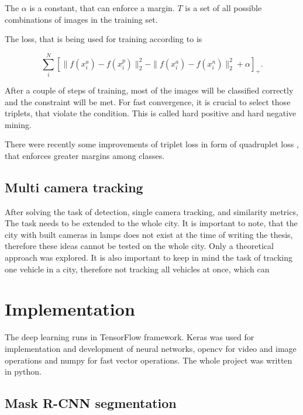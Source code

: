 \documentclass[a4paper,11pt,titlepage,twoside]{article}
\numberwithin{figure}{section}
\begin{document}
The $\alpha$ is a constant, that can enforce a margin. $T$ is a set of all possible combinations of images in the training set.

The loss, that is being used for training according to \cite{szegedy2015going} is 

\begin{equation}
\sum_i^N [\|f(x_i^a) - f(x_i^p)\|^2_2 - \|f(x_i^a) - f(x_i^n)\|^2_2 + \alpha]_+.
\end{equation}

After a couple of steps of training, most of the images will be classified correctly and the constraint will be met. For fast convergence, it is crucial to select those triplets, that violate the condition. This is called hard positive and hard negative mining.

There were recently some improvements of triplet loss in form of quadruplet loss \cite{chen2017beyond}, that enforces greater margins among classes.

\clearpage
\subsection{Multi camera tracking}
\label{sec:multi-camera-tracking}
After solving the task of detection, single camera tracking, and similarity metrics, The task needs to be extended to the whole city. It is important to note, that the city with built cameras in lamps does not exist at the time of writing the thesis, therefore these ideas cannot be tested on the whole city. Only a theoretical approach was explored. It is also important to keep in mind the task of tracking one vehicle in a city, therefore not tracking all vehicles at once, which can 


\clearpage
\section{Implementation}

The deep learning runs in TensorFlow \cite{abadi2016tensorflow} framework. Keras \cite{chollet2015keras} was used for implementation and development of neural networks, opencv \cite{opencv} for video and image operations and numpy \cite{walt2011numpy} for fast vector operations. The whole project was written in python.


\subsection{Mask R-CNN segmentation}
\label{sec:mask-rcnn}
\end{document}
